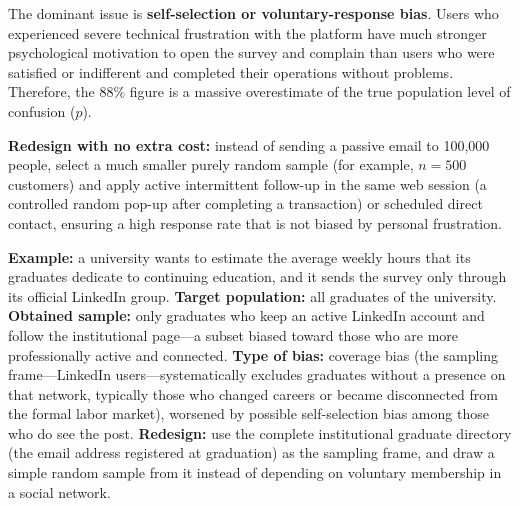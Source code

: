 \begin{solproblema}
	The dominant issue is \textbf{self-selection or voluntary-response bias}. Users who experienced severe technical frustration with the platform have much stronger psychological motivation to open the survey and complain than users who were satisfied or indifferent and completed their operations without problems. Therefore, the $88\%$ figure is a massive overestimate of the true population level of confusion ($p$).

	\textbf{Redesign with no extra cost:} instead of sending a passive email to 100,000 people, select a much smaller purely random sample (for example, $n = 500$ customers) and apply active intermittent follow-up in the same web session (a controlled random pop-up after completing a transaction) or scheduled direct contact, ensuring a high response rate that is not biased by personal frustration.
\end{solproblema}

\begin{solproblema}[prob:701b535]
	\textbf{Example:} a university wants to estimate the average weekly hours that its graduates dedicate to continuing education, and it sends the survey only through its official LinkedIn group. \textbf{Target population:} all graduates of the university. \textbf{Obtained sample:} only graduates who keep an active LinkedIn account and follow the institutional page---a subset biased toward those who are more professionally active and connected. \textbf{Type of bias:} coverage bias (the sampling frame---LinkedIn users---systematically excludes graduates without a presence on that network, typically those who changed careers or became disconnected from the formal labor market), worsened by possible self-selection bias among those who do see the post. \textbf{Redesign:} use the complete institutional graduate directory (the email address registered at graduation) as the sampling frame, and draw a simple random sample from it instead of depending on voluntary membership in a social network.
\end{solproblema}
